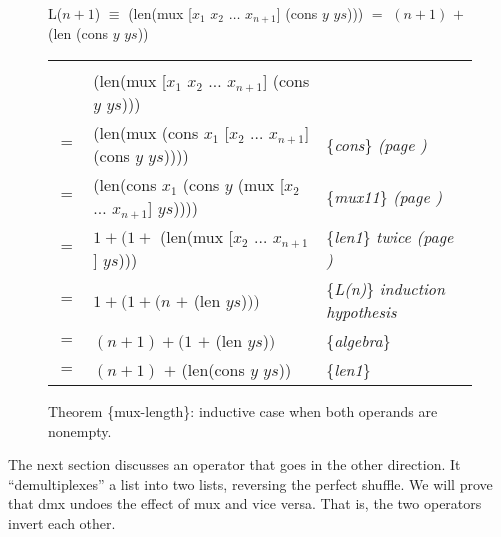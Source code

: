 \begin{figure}
\begin{center}
L($n+1$) $\equiv$ \textsf{(len(mux [$x_1$ $x_2$ $\dots$ $x_{n+1}$] (cons $y$ $ys$))) $=$ $(n+1)$ $+$ (len (cons $y$ $ys$))}
\begin{tabular}{lll}
\hline\\[-1.0em]
    & \textsf{(len(mux [$x_1$ $x_2$ $\dots$ $x_{n+1}$] (cons $y$ $ys$)))}        &   \\
$=$ & \textsf{(len(mux (cons $x_1$ [$x_2$ $\dots$ $x_{n+1}$] (cons $y$ $ys$))))} & \{\emph{cons}\} \emph{(page \pageref{first-rest-cons})} \\
$=$ & \textsf{(len(cons $x_1$ (cons $y$ (mux [$x_2$ $\dots$ $x_{n+1}$] $ys$))))} & \{\emph{mux11}\} \emph{(page \pageref{axioms:mux})}\\
$=$ & $1 + (1 +$ \textsf{(len(mux [$x_2$ $\dots$ $x_{n+1}$] $ys$))})             & \{\emph{len1}\} \emph{twice (page \pageref{len-equations})}\\
$=$ & $1 + (1 + (n$ $+$ \textsf{(len $ys$)}$))$                                  & \{\emph{L(n)}\} \emph{induction hypothesis} \\
$=$ & $(n + 1) + (1$ $+$ \textsf{(len $ys$)}$)$                                  & \{\emph{algebra}\} \\
$=$ & $(n + 1)$ $+$ \textsf{(len(cons $y$ $ys$))}                                & \{\emph{len1}\} \\
\end{tabular}
\end{center}
\caption{Theorem \{mux-length\}: inductive case when both operands are nonempty.}
\label{fig:prf-mux-len-induc}
\end{figure}

The next section discusses an operator that goes in the other direction.
It ``demultiplexes'' a list into two lists, reversing the perfect shuffle.
We will prove that \textsf{dmx} undoes the effect of \textsf{mux} and vice versa.
That is, the two operators invert each other.

